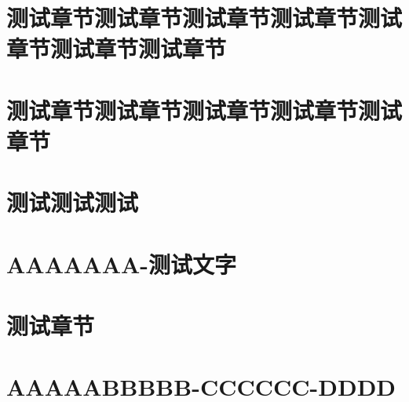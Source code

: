 \documentclass[color=blue]{textbook-cn}%
\begin{document}
\part{测试章节测试章节测试章节测试章节测试章节测试章节测试章节}
\part[测试章节]{测试章节测试章节测试章节测试章节测试章节}

\lipsum\lipsum


\part{测试测试测试}



\backmatter

\lipsum

\part*{AAAAAAA-测试文字}
\partintro{\zhlipsum[2]}
\part{测试章节}
\part[BabyBabyBaby]{AAAAABBBBB-CCCCCC-DDDD}


\lipsum
\makeatletter























\lipsum[2]


\makeatother
\end{document}
